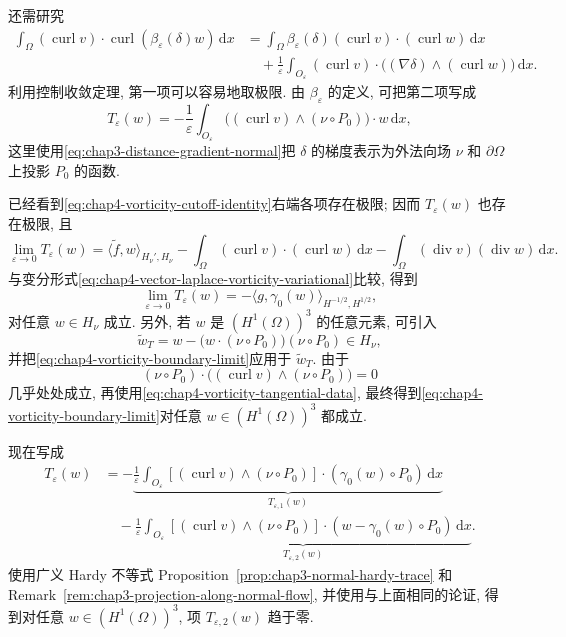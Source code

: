 \begin{Proof}
\begin{itemize}
还需研究
\begin{align*}
 \int_\Omega(\operatorname{curl}v)\cdot\operatorname{curl}(\beta_\varepsilon(\delta)w)\,\mathrm dx
 &=\int_\Omega\beta_\varepsilon(\delta)(\operatorname{curl}v)\cdot(\operatorname{curl}w)\,\mathrm dx\\
 &\quad+\frac1\varepsilon\int_{O_\varepsilon}(\operatorname{curl}v)\cdot
 \bigl((\nabla\delta)\wedge(\operatorname{curl}w)\bigr)\,\mathrm dx.
\end{align*}
利用控制收敛定理, 第一项可以容易地取极限. 由 $\beta_\varepsilon$ 的定义, 可把第二项写成
\[
 T_\varepsilon(w)=-\frac1\varepsilon\int_{O_\varepsilon}
 \bigl((\operatorname{curl}v)\wedge(\nu\circ P_0)\bigr)\cdot w\,\mathrm dx,
\]
这里使用\eqref{eq:chap3-distance-gradient-normal}把 $\delta$ 的梯度表示为外法向场 $\nu$ 和 $\partial\Omega$ 上投影 $P_0$ 的函数.

已经看到\eqref{eq:chap4-vorticity-cutoff-identity}右端各项存在极限; 因而 $T_\varepsilon(w)$ 也存在极限, 且
\[
 \lim_{\varepsilon\to0}T_\varepsilon(w)
 =\langle\widetilde f,w\rangle_{H_\nu',H_\nu}
 -\int_\Omega(\operatorname{curl}v)\cdot(\operatorname{curl}w)\,\mathrm dx
 -\int_\Omega(\operatorname{div}v)(\operatorname{div}w)\,\mathrm dx.
\]
与变分形式\eqref{eq:chap4-vector-laplace-vorticity-variational}比较, 得到
\begin{equation}
 \lim_{\varepsilon\to0}T_\varepsilon(w)
 =-\langle g,\gamma_0(w)\rangle_{H^{-1/2},H^{1/2}},
 \label{eq:chap4-vorticity-boundary-limit}
\end{equation}
对任意 $w\in H_\nu$ 成立. 另外, 若 $w$ 是 $(H^1(\Omega))^3$ 的任意元素, 可引入
\[
 \widetilde w_T=w-\bigl(w\cdot(\nu\circ P_0)\bigr)(\nu\circ P_0)\in H_\nu,
\]
并把\eqref{eq:chap4-vorticity-boundary-limit}应用于 $\widetilde w_T$. 由于
\[
 (\nu\circ P_0)\cdot\bigl((\operatorname{curl}v)\wedge(\nu\circ P_0)\bigr)=0
\]
几乎处处成立, 再使用\eqref{eq:chap4-vorticity-tangential-data}, 最终得到\eqref{eq:chap4-vorticity-boundary-limit}对任意 $w\in(H^1(\Omega))^3$ 都成立.

现在写成
\begin{align*}
 T_\varepsilon(w)
 &=-\underbrace{\frac1\varepsilon\int_{O_\varepsilon}
 [ (\operatorname{curl}v)\wedge(\nu\circ P_0)]\cdot(\gamma_0(w)\circ P_0)\,\mathrm dx}_{T_{\varepsilon,1}(w)}\\
 &\quad-\underbrace{\frac1\varepsilon\int_{O_\varepsilon}
 [ (\operatorname{curl}v)\wedge(\nu\circ P_0)]\cdot
 (w-\gamma_0(w)\circ P_0)\,\mathrm dx}_{T_{\varepsilon,2}(w)}.
\end{align*}
使用广义 Hardy 不等式 Proposition~\ref{prop:chap3-normal-hardy-trace} 和 Remark~\ref{rem:chap3-projection-along-normal-flow}, 并使用与上面相同的论证, 得到对任意 $w\in(H^1(\Omega))^3$, 项 $T_{\varepsilon,2}(w)$ 趋于零.


\end{itemize}
\end{Proof}
